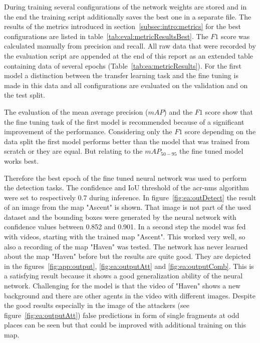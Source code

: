 During training several configurations of the network weights are stored and in the end the training 
script additionally saves the best one in a separate file. The results of the metrics introduced in 
section~\ref{subsec:intro:metrics} for the best configurations are listed in 
table~\ref{tab:eval:metricResultsBest}. The $F1$ score was calculated manually from precision 
and recall. All raw data that were recorded by the evaluation script are appended at the end of this 
report as an extended table containing data of several epochs (Table~\ref{tab:ea:metricResults}). 
For the first model a distinction between the transfer learning task and the fine tuning is made in this 
data and all configurations are evaluated on the validation and on the test split. 

The evaluation of the mean average precision ($mAP$) and the $F1$ score show that the fine tuning 
task of the first model is recommended because of a significant improvement of the performance. 
Considering only the $F1$ score depending on the data split the first model performs better than the 
model that was trained from scratch or they are equal. But relating to the $mAP_{50-95}$ the fine 
tuned model works best.

Therefore the best epoch of the fine tuned neural network was used to perform the detection tasks. 
The confidence and IoU threshold of the \gls{acr-nms} algorithm were set to respectively 0.7 during 
inference. In figure~\ref{fig:ea:outDetect} the result of an image from the map "Ascent" is shown. 
That image is not part of the used dataset and the bounding boxes were generated by the neural 
network with confidence values between 0.852 and 0.901. In a second step the model was fed with 
videos, starting with the trained map "Ascent". This worked very well, so also a recording of the map 
"Haven" was tested. The network has never learned about the map "Haven" before but the results 
are quite good. They are depicted in the figures~\ref{fig:app:output}, \ref{fig:ea:outputAtt} and 
\ref{fig:ea:outputComb}. This is a satisfying result because it shows a good generalization ability of 
the neural network. Challenging for the model is that the video of "Haven" shows a new background 
and there are other agents in the video with different images. Despite the good results especially in 
the image of the attackers (see figure~\ref{fig:ea:outputAtt}) false predictions in form of single 
fragments at odd places can be seen but that could be improved with additional training on this map.
